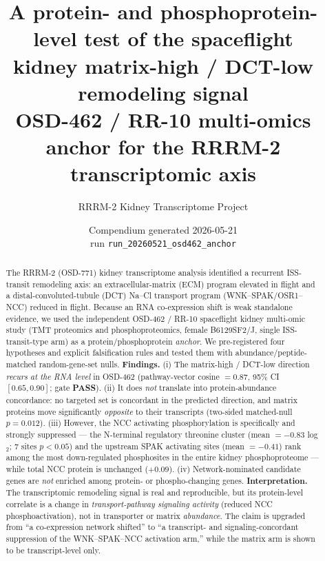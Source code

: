 \documentclass[11pt]{article}
\title{\textbf{A protein- and phosphoprotein-level test of the spaceflight\\
kidney matrix-high / DCT-low remodeling signal}\\[4pt]
\large OSD-462 / RR-10 multi-omics anchor for the RRRM-2 transcriptomic axis}
\author{RRRM-2 Kidney Transcriptome Project}
\date{Compendium generated 2026-05-21 \\ run \texttt{run\_20260521\_osd462\_anchor}}
\newcommand{\pass}{\textcolor{green!55!black}{\textbf{PASS}}}
\begin{document}
\maketitle

\begin{abstract}
\noindent The RRRM-2 (OSD-771) kidney transcriptome analysis identified a recurrent
ISS-transit remodeling axis: an extracellular-matrix (ECM) program elevated in flight
and a distal-convoluted-tubule (DCT) Na--Cl transport program (WNK--SPAK/OSR1--NCC)
reduced in flight. Because an RNA co-expression shift is weak standalone evidence, we
used the independent OSD-462 / RR-10 spaceflight kidney multi-omic study (TMT
proteomics and phosphoproteomics, female B6129SF2/J, single ISS-transit-type arm) as a
protein/phosphoprotein \emph{anchor}. We pre-registered four hypotheses and explicit
falsification rules and tested them with abundance/peptide-matched random-gene-set
nulls. \textbf{Findings.} (i) The matrix-high / DCT-low direction \emph{recurs at the
RNA level} in OSD-462 (pathway-vector cosine $=0.87$, 95\% CI
$[0.65,0.90]$; gate \pass{}). (ii) It does \emph{not} translate
into protein-abundance concordance: no targeted set is concordant in the predicted
direction, and matrix proteins move significantly \emph{opposite} to their transcripts
(two-sided matched-null $p=0.012$). (iii) However, the NCC activating
phosphorylation is specifically and strongly suppressed --- the N-terminal regulatory
threonine cluster (mean $=-0.83$ log$_2$;
7 sites $p<0.05$) and the upstream SPAK
activating sites (mean $=-0.41$) rank among the most
down-regulated phosphosites in the entire kidney phosphoproteome --- while total NCC
protein is unchanged ($+0.09$). (iv) Network-nominated
candidate genes are \emph{not} enriched among protein- or phospho-changing genes.
\textbf{Interpretation.} The transcriptomic remodeling signal is real and reproducible,
but its protein-level correlate is a change in \emph{transport-pathway signaling activity}
(reduced NCC phosphoactivation), not in transporter or matrix \emph{abundance}. The claim
is upgraded from ``a co-expression network shifted'' to ``a transcript- and
signaling-concordant suppression of the WNK--SPAK--NCC activation arm,'' while the matrix
arm is shown to be transcript-level only.
\end{abstract}
\end{document}

